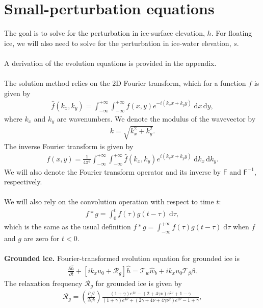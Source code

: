 \documentclass[paper=a4, fontsize=11pt]{article}
\begin{document}
\section*{Small-perturbation equations}
The goal is to solve for the perturbation in ice-surface elevation, $h$.
For floating ice, we will also need to solve for the perturbation
in ice-water elevation, $s$. \\ \\
A derivation of the evolution equations is provided in the appendix.
\\ \\
The solution method relies on the 2D Fourier transform, which for a function $f$
is given by
\begin{align}
\widehat{f}(k_x,k_y)  = \int_{-\infty}^{+\infty}\int_{-\infty}^{+\infty} f(x,y)e^{-i(k_x x + k_y y)} \; \mathrm{d}x\,\mathrm{d}y,
\end{align}
where $k_x$ and $k_y$ are wavenumbers. We denote the modulus of the wavevector by
\begin{align}
k = \sqrt{k_x^2 + k_y^2}.
\end{align}
The inverse Fourier transform is given by
\begin{align}
{f}(x,y) = \frac{1}{4\pi^2}\int_{-\infty}^{+\infty}\int_{-\infty}^{+\infty} \widehat{f}(k_x,k_y)e^{i(k_x x + k_y y)} \; \mathrm{d}k_x \, \mathrm{d}k_y.
\end{align}
We will also denote the Fourier transform operator and its inverse by $\mathsf{F}$ and
$\mathsf{F}^{-1}$, respectively.
\\ \\
We will also rely on the convolution operation with respect to time $t$:
\begin{align}
f*g = \int_0^t f(\tau)g(t-\tau)\;\mathrm{d}\tau,
\end{align}
which is the same as the usual definition $f*g = \int_{-\infty}^{+\infty} f(\tau)g(t-\tau)\;\mathrm{d}\tau$
when $f$ and $g$ are zero for $t<0$.
\\ \\
\textbf{Grounded ice.} Fourier-transformed evolution equation for grounded ice is
\begin{align}
\frac{\partial \widehat{h}}{\partial t}+ \left[ik_xu_0  + \mathcal{R}_g\right]\widehat{h} = \mathcal{T}_w\widehat{w}_b+ik_xu_0\mathcal{T}_{\beta} \widehat{\beta}.
\end{align}
The relaxation frequency $\mathcal{R}_g$ for grounded ice is given by
\begin{align}
\mathcal{R}_g = \left(\frac{\rho_i g }{2\eta k}\right)\frac{ (1+\gamma)e^{4\nu} -(2+4\gamma\nu)e^{2\nu} +1-\gamma  }{ (1+\gamma)e^{4\nu} + (2\gamma+4\nu+4\gamma\nu^2)e^{2\nu} -1 + \gamma  },
\end{align}
\end{document}
